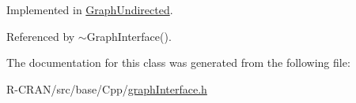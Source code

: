Implemented in \hyperlink{classGraphUndirected_ad2b1cd9a6dded42bd5431134aba26612}{Graph\+Undirected}.



Referenced by $\sim$\+Graph\+Interface().



The documentation for this class was generated from the following file\+:\begin{DoxyCompactItemize}
\item 
R-\/\+C\+R\+A\+N/src/base/\+Cpp/\hyperlink{graphInterface_8h}{graph\+Interface.\+h}\end{DoxyCompactItemize}
